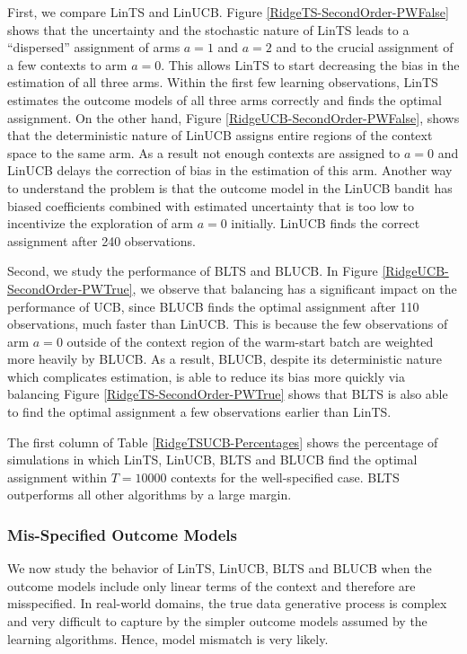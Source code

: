 \documentclass[letterpaper]{article} %
\begin{document}
First, we compare LinTS and LinUCB. 
Figure \ref{RidgeTS-SecondOrder-PWFalse} shows that 
the uncertainty and the stochastic nature of LinTS leads to a ``dispersed'' assignment of arms $a=1$ and $a=2$ and to the crucial assignment of a few contexts to arm $a = 0$. 
This allows LinTS to start decreasing the bias in the estimation of all three arms.
Within the first few learning observations, LinTS estimates the outcome models of all three arms correctly and finds the optimal assignment. 
On the other hand, Figure \ref{RidgeUCB-SecondOrder-PWFalse}, shows that the deterministic nature of LinUCB assigns entire regions of the context space to the same arm. 
As a result not enough contexts are assigned to $a=0$ and LinUCB delays the correction of bias in the estimation of this arm.  
Another way to understand the problem is that the outcome model in the LinUCB bandit has biased coefficients combined with estimated uncertainty that is too low to incentivize the exploration of arm $a = 0$ initially. 
LinUCB finds the correct assignment after 240 observations.

Second, we study the performance of  BLTS and BLUCB.
In Figure \ref{RidgeUCB-SecondOrder-PWTrue}, we observe that balancing has a significant impact on the performance of UCB, since BLUCB finds the optimal assignment after 110 observations, much faster than LinUCB.
This is because the few observations of arm $a = 0$ outside of the context region of the warm-start batch are weighted more heavily by BLUCB. 
As a result, BLUCB, despite its deterministic nature which complicates estimation, is able to reduce its bias more quickly via balancing 
Figure \ref{RidgeTS-SecondOrder-PWTrue} shows that BLTS is also able to find the optimal assignment a few observations earlier than LinTS.

The first column of Table \ref{RidgeTSUCB-Percentages} shows the percentage of simulations in which LinTS, LinUCB, BLTS and BLUCB find the optimal assignment within $T = 10000$ contexts for the well-specified case.
BLTS outperforms all other algorithms by a large margin.


\subsubsection{Mis-Specified Outcome Models}

We now study the behavior of LinTS, LinUCB, BLTS and BLUCB when the outcome models include only linear terms of the context and therefore are misspecified.
In real-world domains, the true data generative process is complex and very difficult to capture by the simpler outcome models assumed by the learning algorithms. 
Hence, model mismatch is very likely. 
\end{document}
